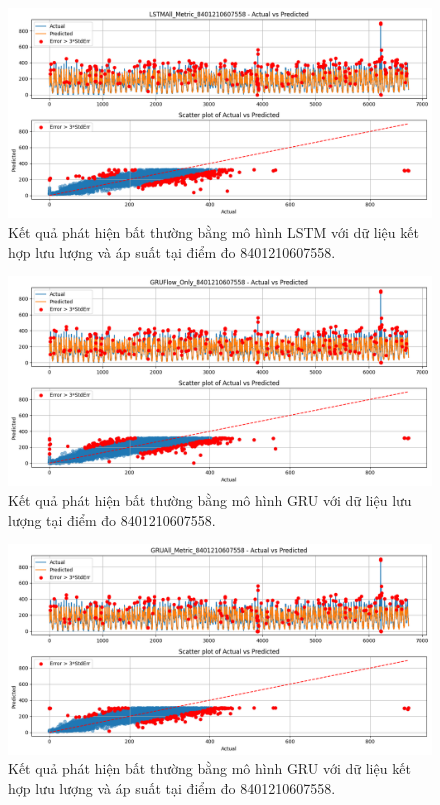 \begin{figure}[H]
    \centering
    \includegraphics[width=\textwidth]{image/section6_3/anomaly_detection_8401210607558_lstm_all_metric.png}
    \caption{Kết quả phát hiện bất thường bằng mô hình LSTM với dữ liệu kết hợp lưu lượng và áp suất tại điểm đo 8401210607558.}
    \label{fig:anomaly_lstm_8401210607558_all}
\end{figure}

\begin{figure}[H]
    \centering
    \includegraphics[width=\textwidth]{image/section6_3/anomaly_detection_8401210607558_gru_flow.png}
    \caption{Kết quả phát hiện bất thường bằng mô hình GRU với dữ liệu lưu lượng tại điểm đo 8401210607558.}
    \label{fig:anomaly_gru_8401210607558_flow}
\end{figure}

\begin{figure}[H]
    \centering
    \includegraphics[width=\textwidth]{image/section6_3/anomaly_detection_8401210607558_gru_allmetric.png}
    \caption{Kết quả phát hiện bất thường bằng mô hình GRU với dữ liệu kết hợp lưu lượng và áp suất tại điểm đo 8401210607558.}
    \label{fig:anomaly_gru_8401210607558_all}
\end{figure}

